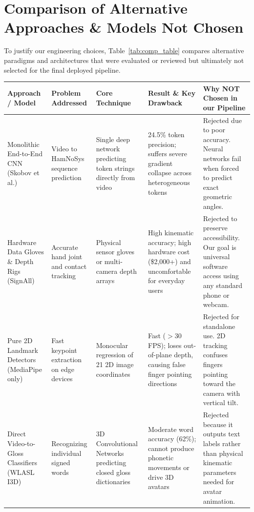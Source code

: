 \documentclass[11pt, a4paper]{article}
\begin{document}
\section{Comparison of Alternative Approaches \& Models Not Chosen}
\noindent
To justify our engineering choices, Table~\ref{tab:comp_table} compares alternative paradigms and architectures that were evaluated or reviewed but ultimately not selected for the final deployed pipeline.

\begin{table}[H]
    \centering
    \scriptsize
    \renewcommand{\arraystretch}{1.25}
    \begin{tabular}{|p{2.4cm}|p{2.6cm}|p{2.6cm}|p{3.5cm}|p{3.8cm}|}
        \hline
        \textbf{Approach / Model} & \textbf{Problem Addressed} & \textbf{Core Technique} & \textbf{Result \& Key Drawback} & \textbf{Why NOT Chosen in our Pipeline} \\
        \hline
        Monolithic End-to-End CNN (Skobov et al.)~\cite{skobov2020} & Video to HamNoSys sequence prediction & Single deep network predicting token strings directly from video & 24.5\% token precision; suffers severe gradient collapse across heterogeneous tokens & Rejected due to poor accuracy. Neural networks fail when forced to predict exact geometric angles. \\
        \hline
        Hardware Data Gloves \& Depth Rigs (SignAll)~\cite{signall2019} & Accurate hand joint and contact tracking & Physical sensor gloves or multi-camera depth arrays & High kinematic accuracy; high hardware cost (\$2,000+) and uncomfortable for everyday users & Rejected to preserve accessibility. Our goal is universal software access using any standard phone or webcam. \\
        \hline
        Pure 2D Landmark Detectors (MediaPipe only)~\cite{lugaresi2019} & Fast keypoint extraction on edge devices & Monocular regression of 21 2D image coordinates & Fast ($>30$ FPS); loses out-of-plane depth, causing false finger pointing directions & Rejected for standalone use. 2D tracking confuses fingers pointing toward the camera with vertical tilt. \\
        \hline
        Direct Video-to-Gloss Classifiers (WLASL I3D)~\cite{li2020wlasl} & Recognizing individual signed words & 3D Convolutional Networks predicting closed gloss dictionaries & Moderate word accuracy (62\%); cannot produce phonetic movements or drive 3D avatars & Rejected because it outputs text labels rather than physical kinematic parameters needed for avatar animation. \\

\end{tabular}
\end{table}
\end{document}
